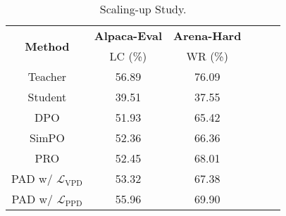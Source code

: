 \begin{table}[ht]
\small
\centering
\setlength{\tabcolsep}{1.3em}
\renewcommand{\arraystretch}{1.2}
\begin{tabular}{cccccc}
\hline
\multirow{2}{*}{\textbf{Method}} & \textbf{Alpaca-Eval} & \textbf{Arena-Hard} \\ \cline{2-3} 
& LC (\%) & WR (\%) \\ \hline
Teacher  & 56.89 & 76.09    \\ 
Student  & 39.51 & 37.55  \\ 
DPO   & 51.93 & 65.42  \\ 
SimPO   & 52.36 & 66.36  \\ 
PRO   & 52.45 & 68.01  \\ 
\hline
PAD w/ $\mathcal{L}_\text{VPD}$   & 53.32 & 67.38 \\
PAD w/ $\mathcal{L}_\text{PPD}$   & 55.96 & 69.90  \\ \hline
\end{tabular}
\caption{Scaling-up Study.}
\label{tab:scaling_up}
\end{table}
